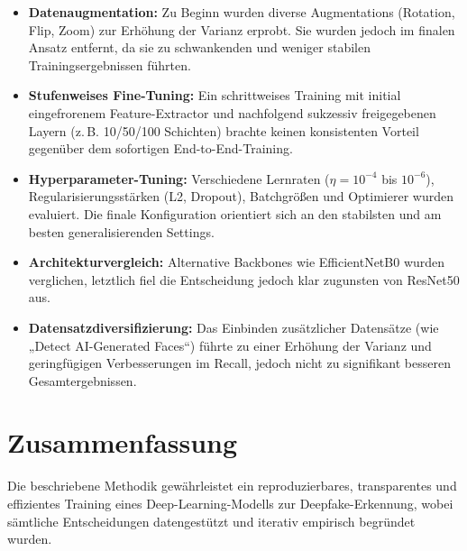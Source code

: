 \begin{itemize}
    \item \textbf{Datenaugmentation:}  
        Zu Beginn wurden diverse Augmentations (Rotation, Flip, Zoom) zur Erhöhung der Varianz erprobt. Sie wurden jedoch im finalen Ansatz entfernt, da sie zu schwankenden und weniger stabilen Trainingsergebnissen führten.
    \item \textbf{Stufenweises Fine-Tuning:}  
        Ein schrittweises Training mit initial eingefrorenem Feature-Extractor und nachfolgend sukzessiv freigegebenen Layern (z.\,B. 10/50/100 Schichten) brachte keinen konsistenten Vorteil gegenüber dem sofortigen End-to-End-Training.
    \item \textbf{Hyperparameter-Tuning:}  
        Verschiedene Lernraten ($\eta=10^{-4}$ bis $10^{-6}$), Regularisierungsstärken (L2, Dropout), Batchgrößen und Optimierer wurden evaluiert. Die finale Konfiguration orientiert sich an den stabilsten und am besten generalisierenden Settings.
    \item \textbf{Architekturvergleich:}  
        Alternative Backbones wie EfficientNetB0 wurden verglichen, letztlich fiel die Entscheidung jedoch klar zugunsten von ResNet50 aus.
    \item \textbf{Datensatzdiversifizierung:}  
        Das Einbinden zusätzlicher Datensätze (wie „Detect AI-Generated Faces“) führte zu einer Erhöhung der Varianz und geringfügigen Verbesserungen im Recall, jedoch nicht zu signifikant besseren Gesamtergebnissen.
\end{itemize}

\section{Zusammenfassung}

Die beschriebene Methodik gewährleistet ein reproduzierbares, transparentes und effizientes Training eines Deep-Learning-Modells zur Deepfake-Erkennung, wobei sämtliche Entscheidungen datengestützt und iterativ empirisch begründet wurden.
